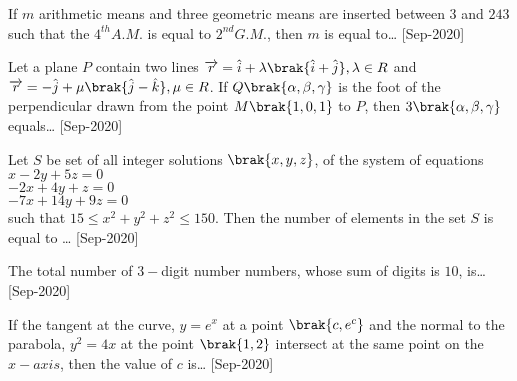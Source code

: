 \iffalse
    \title{2020}
    \author{EE24BTECH11021}
    \section{integer}
\fi
    \item If $m$ arithmetic means and three geometric means  are inserted between $3$ and $243$ such that the $4^{th} A.M.$ is equal to $2^{nd}G.M.$, then $m$ is equal to\dots
    \hfill{[Sep-2020]}
    \item Let a plane $P$ contain two lines $\overrightarrow{r}=\hat{i}+\lambda\brak{\hat{i}+\hat{j}},\lambda\in R$ and $\overrightarrow{r}= -\hat{j}+\mu\brak{\hat{j}-\hat{k}},\mu\in R$. If $Q\brak{\alpha,\beta,\gamma}$ is the foot of the perpendicular drawn from the point $M\brak{1,0,1}$ to $P$, then $3\brak{\alpha,\beta,\gamma}$ equals\dots
    \hfill{[Sep-2020]}
    \item Let $S$ be set of all integer solutions $\brak{x,y,z}$, of the system of equations\\
        $x-2y+5z=0$\\
        $-2x+4y+z=0$\\
        $-7x+14y+9z=0$\\
        such that $15\leq x^2+y^2+z^2\leq 150$. Then the number of elements in the set $S$ is equal to \dots
       \hfill{[Sep-2020]}
    \item The total number of $3-$digit number numbers, whose sum of digits is $10$, is\dots
    \hfill{[Sep-2020]}
    \item If the tangent at the curve, $y=e^x$ at a point $\brak{c,e^c}$ and the normal to the parabola, $y^2=4x$ at the point $\brak{1,2}$ intersect at the same point on the $x-axis$, then the value of $c$ is\dots 
    \hfill{[Sep-2020]}
